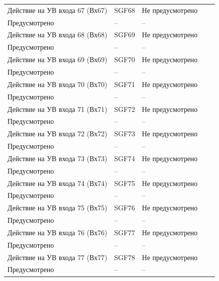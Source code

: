 \begin{longtable}{|>{\centering\arraybackslash}m{5.3cm}|>{\centering\arraybackslash}m{3.3cm}|>{\centering\arraybackslash}m{4.2cm}|>{\centering\arraybackslash}m{1.8cm}|>{\centering\arraybackslash}m{1cm}|}
\hline
\centering Действие на УВ входа 67 (Вх67)  & \centering SGF68 & \centering Не предусмотрено \\ Предусмотрено & \centering -- & \centering \arraybackslash -- \\
\hline
\centering Действие на УВ входа 68 (Вх68)  & \centering SGF69 & \centering Не предусмотрено \\ Предусмотрено & \centering -- & \centering \arraybackslash -- \\
\hline
\centering Действие на УВ входа 69 (Вх69)  & \centering SGF70 & \centering Не предусмотрено \\ Предусмотрено & \centering -- & \centering \arraybackslash -- \\
\hline
\centering Действие на УВ входа 70 (Вх70)  & \centering SGF71 & \centering Не предусмотрено \\ Предусмотрено & \centering -- & \centering \arraybackslash -- \\
\hline
\centering Действие на УВ входа 71 (Вх71)  & \centering SGF72 & \centering Не предусмотрено \\ Предусмотрено & \centering -- & \centering \arraybackslash -- \\
\hline
\centering Действие на УВ входа 72 (Вх72)  & \centering SGF73 & \centering Не предусмотрено \\ Предусмотрено & \centering -- & \centering \arraybackslash -- \\
\hline
\centering Действие на УВ входа 73 (Вх73)  & \centering SGF74 & \centering Не предусмотрено \\ Предусмотрено & \centering -- & \centering \arraybackslash -- \\
\hline
\centering Действие на УВ входа 74 (Вх74)  & \centering SGF75 & \centering Не предусмотрено \\ Предусмотрено & \centering -- & \centering \arraybackslash -- \\
\hline
\centering Действие на УВ входа 75 (Вх75)  & \centering SGF76 & \centering Не предусмотрено \\ Предусмотрено & \centering -- & \centering \arraybackslash -- \\
\hline
\centering Действие на УВ входа 76 (Вх76)  & \centering SGF77 & \centering Не предусмотрено \\ Предусмотрено & \centering -- & \centering \arraybackslash -- \\
\hline
\centering Действие на УВ входа 77 (Вх77)  & \centering SGF78 & \centering Не предусмотрено \\ Предусмотрено & \centering -- & \centering \arraybackslash -- \\

\end{longtable}

